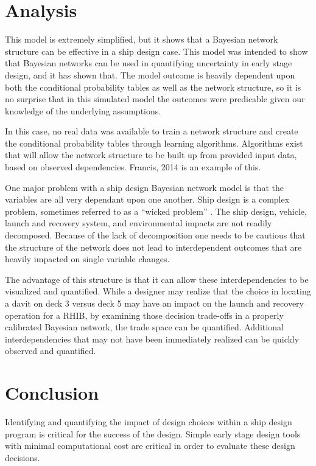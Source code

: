 \documentclass{svproc}
\begin{document}
\section{Analysis} 

This model is extremely simplified, but it shows that a Bayesian network structure can be effective in a ship design case. This model was intended to show that Bayesian networks can be used in quantifying uncertainty in early stage design, and it has shown that. The model outcome is heavily dependent upon both the conditional probability tables as well as the network structure, so it is no surprise that in this simulated model the outcomes were predicable given our knowledge of the underlying assumptions. 

In this case, no real data was available to train a network structure and create the conditional probability tables through learning algorithms. Algorithms exist that will allow the network structure to be built up from provided input data, based on observed dependencies. Francis, 2014 \cite{francis_bayesian_2014} is an example of this.

One major problem with a ship design Bayesian network model is that the variables are all very dependant upon one another. Ship design is a complex problem, sometimes referred to as a ``wicked problem'' \cite{andrews_comprehensive_1998}. The ship design, vehicle, launch and recovery system, and environmental impacts are not readily decomposed.  Because of the lack of decomposition one needs to be cautious that the structure of the network does not lead to interdependent outcomes that are heavily impacted on single variable changes. 

The advantage of this structure is that it can allow these interdependencies to be visualized and quantified. While a designer may realize that the choice in locating a davit on deck 3 versus deck 5 may have an impact on the launch and recovery operation for a RHIB, by examining those decision trade-offs in a properly calibrated Bayesian network, the trade space can be quantified. Additional interdependencies that may not have been immediately realized can be quickly observed and quantified. 

\section{Conclusion}

Identifying and quantifying the impact of design choices within a ship design program is critical for the success of the design. Simple early stage design tools with minimal computational cost are critical in order to evaluate these design decisions. 
\end{document}
